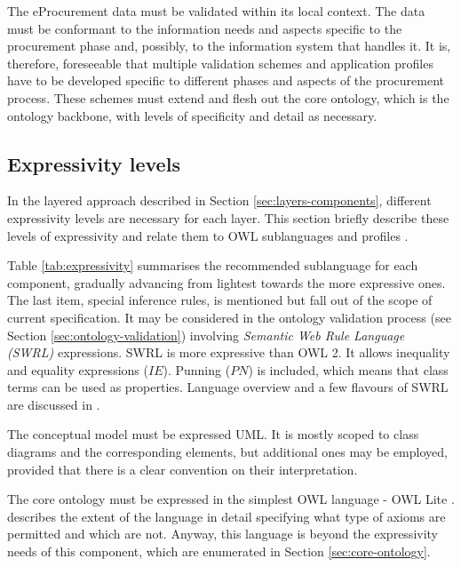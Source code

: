 	The eProcurement data must be validated within its local context. The data must be conformant to the information needs and aspects specific to the procurement phase and, possibly, to the information system that handles it. It is, therefore, foreseeable that multiple validation schemes and application profiles have to be developed specific to different phases and aspects of the procurement process. These schemes must extend and flesh out the core ontology, which is the ontology backbone, with levels of specificity and detail as necessary. 
	
	
	\subsection{Expressivity levels}
	\label{sec:expressivity}

	In the layered approach described in Section \ref{sec:layers-components}, different expressivity levels are necessary for each layer. This section briefly describe these levels of expressivity and relate them to OWL sublanguages \citep{owl1} and profiles \citep{owl2-profiles}. 
	
	Table \ref{tab:expressivity} summarises the recommended sublanguage for each component, gradually advancing from lightest towards the more expressive ones. The last item, special inference rules, is mentioned but fall out of the scope of current specification. It may be considered in the ontology validation process (see Section \ref{sec:ontology-validation}) involving \textit{Semantic Web Rule Language (SWRL)} expressions. SWRL \citep{swrl-horrocks2004} is more expressive than OWL 2. It allows inequality and equality expressions ($IE$). Punning ($PN$) is included, which means that class terms can be used as properties. Language overview and a few flavours of SWRL are discussed in \cite{swrl-expressivness}.
	
	The conceptual model must be expressed UML. It is mostly scoped to class diagrams and the corresponding elements, but additional ones may be employed, provided that there is a clear convention on their interpretation. 
	
	The core ontology must be expressed in the simplest OWL language - OWL Lite \cite{owl1}. \citet[Sec.8.3]{owl1} describes the extent of the language in detail specifying what type of axioms are permitted and which are not. Anyway, this language is beyond the expressivity needs of this component, which are enumerated in Section \ref{sec:core-ontology}.
	
